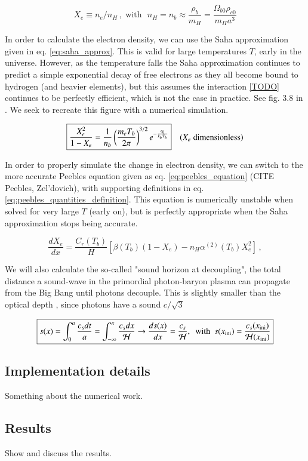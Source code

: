 \begin{equation}\label{eq:fractional_electron_density}
\boxed{X_e \equiv n_e / n_H}\,, \text{ with } \,\, n_H = n_b \approx \frac{\rho_b}{m_H} = \frac{\Omega_{b0} \rho_{c0}}{m_H a^3}
\end{equation}


In order to calculate the electron density, we can use the Saha approximation given in eq. \ref{eq:saha_approx}. This is valid for large temperatures $T$, early in the universe. However, as the temperature falls the Saha approximation continues to predict a simple exponential decay of free electrons as they all become bound to hydrogen (and heavier elements), but this assumes the interaction \ref{TODO} continues to be perfectly efficient, which is not the case in practice. See fig. 3.8 in \citet[sec. 3.3.3]{baumannLectureNotesCosmology2017}. We seek to recreate this figure with a numerical simulation.

\begin{equation}\label{eq:saha_approx}
\boxed{\frac{X_e^2}{1-X_e} = \frac{1}{n_b} \left(\frac{m_e T_b}{2\pi}\right)^{3/2} e^{-\frac{\epsilon_0}{k_b T_b}}} \quad {(X_e \; \rm dimensionless)}
\end{equation}

In order to properly simulate the change in electron density, we can switch to the more accurate Peebles equation given as eq. \ref{eq:peebles_equation} (CITE Peebles, Zel'dovich), with supporting definitions in eq. \ref{eq:peebles_quantities_definition}. This equation is numerically unstable when solved for very large $T$ (early on), but is perfectly appropriate when the Saha approximation stops being accurate.

\begin{equation}\label{eq:peebles_equation}
\boxed{\frac{dX_e}{dx} = \frac{C_r(T_b)}{H} \left[\beta(T_b)(1-X_e) - n_H \alpha^{(2)}(T_b)X_e^2\right]}\,,
\end{equation}

We will also calculate the so-called "sound horizon at decoupling", the total distance a sound-wave in the primordial photon-baryon plasma can propagate from the Big Bang until photons decouple. This is slightly smaller than the optical depth , since photons have a sound $c/\sqrt{3}$

\begin{equation}
\boxed{s(x) = \int_0^{a} \frac{c_s dt}{a} = \int_{-\infty}^{x} \frac{c_s dx}{\mathcal{H}} \to \frac{ds(x)}{dx} = \frac{c_s}{\mathcal{H}},\,\,\,\text{with}\,\,\,s(x_{\rm ini}) = \frac{c_s(x_{\rm ini})}{\mathcal{H}(x_{\rm ini})} }
\end{equation}

\subsection{Implementation details}
Something about the numerical work.

\subsection{Results}
Show and discuss the results.
